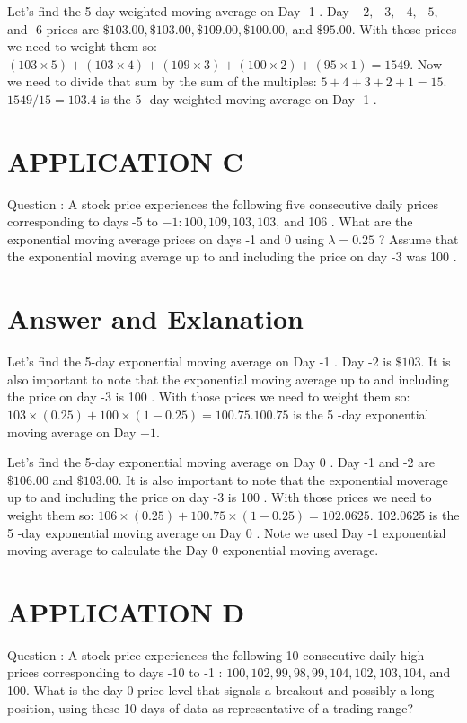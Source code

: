 \documentclass[11pt]{article}
\begin{document}
Let's find the 5-day weighted moving average on Day -1 . Day $-2,-3,-4,-5$, and -6 prices are $\$ 103.00, \$ 103.00, \$ 109.00, \$ 100.00$, and $\$ 95.00$. With those prices we need to weight them so: $(103 \times 5)+(103 \times 4)+(109 \times 3)+(100 \times 2)+(95 \times 1)=1549$. Now we need to divide that sum by the sum of the multiples: $5+4+3+2+1=15$. $1549 / 15=103.4$ is the 5 -day weighted moving average on Day -1 .

\section*{APPLICATION C}
Question : A stock price experiences the following five consecutive daily prices corresponding to days -5 to $-1: 100,109,103,103$, and 106 . What are the exponential moving average prices on days -1 and 0 using $\lambda=0.25$ ? Assume that the exponential moving average up to and including the price on day -3 was 100 .

\section*{Answer and Exlanation}
Let's find the 5-day exponential moving average on Day -1 . Day -2 is $\$ 103$. It is also important to note that the exponential moving average up to and including the price on day -3 is 100 . With those prices we need to weight them so: $103 \times(0.25)+100 \times(1-0.25)=100.75 .100 .75$ is the 5 -day exponential moving average on Day $-1$.

Let's find the 5-day exponential moving average on Day 0 . Day -1 and -2 are $\$ 106.00$ and $\$ 103.00$. It is also important to note that the exponential moverage up to and including the price on day -3 is 100 . With those prices we need to weight them so: $106 \times(0.25)+100.75 \times(1-0.25)=102.0625$. 102.0625 is the 5 -day exponential moving average on Day 0 . Note we used Day -1 exponential moving average to calculate the Day 0 exponential moving average.

\section*{APPLICATION D}
Question : A stock price experiences the following 10 consecutive daily high prices corresponding to days -10 to -1 : $100,102,99,98,99,104,102,103,104$, and 100. What is the day 0 price level that signals a breakout and possibly a long position, using these 10 days of data as representative of a trading range?
\end{document}
